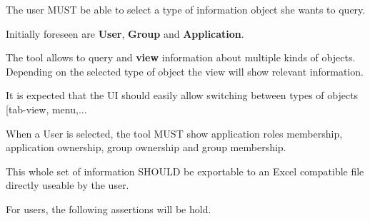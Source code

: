 \documentclass{scrreprt}
\begin{document}
 The user MUST be able to select a type of information object she
 wants to query.

Initially foreseen are \textbf{User}, \textbf{Group} and \textbf{Application}.

\begin{reqmt}
  The tool allows to query and \textbf{view} information about multiple kinds
  of objects. Depending on the selected type of object the view will
  show relevant information.
\end{reqmt}

It is expected that the UI should easily allow switching between types
of objects [tab-view, menu,...

\begin{reqmt}
When a User is selected, the tool MUST show application roles membership,
application ownership, group ownership and group membership.

This whole set of information SHOULD be exportable to an Excel
compatible file directly useable by the user. 
\end{reqmt}
\clearpage{}
\begin{reqmt}
For users, the following assertions will be hold.
\end{reqmt}
\end{document}
